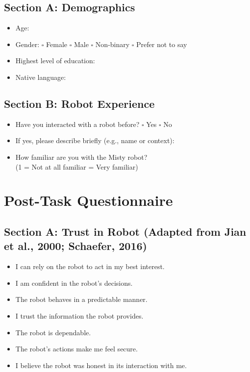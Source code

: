 \documentclass[conference]{IEEEtran}
\begin{document}
\subsection{Section A: Demographics}
\begin{itemize}
\item Age: \underline{\hspace{2cm}}
\item Gender: $\square$ Female \quad $\square$ Male \quad $\square$ Non-binary \quad $\square$ Prefer not to say
\item Highest level of education: \underline{\hspace{3cm}}
\item Native language: \underline{\hspace{3cm}}
\end{itemize}

\subsection{Section B: Robot Experience}
\begin{itemize}
\item Have you interacted with a robot before? $\square$ Yes \quad $\square$ No
\item If yes, please describe briefly (e.g., name or context): \underline{\hspace{5cm}}
\item How familiar are you with the Misty robot? \\
(1 = Not at all familiar     = Very familiar)
\end{itemize}

\section{Post-Task Questionnaire}


\subsection{Section A: Trust in Robot (Adapted from Jian et al., 2000; Schaefer, 2016)}
\begin{itemize}
\item I can rely on the robot to act in my best interest.
\item I am confident in the robot’s decisions.
\item The robot behaves in a predictable manner.
\item I trust the information the robot provides.
\item The robot is dependable.
\item The robot’s actions make me feel secure.
\item I believe the robot was honest in its interaction with me.
\end{itemize}
\end{document}
